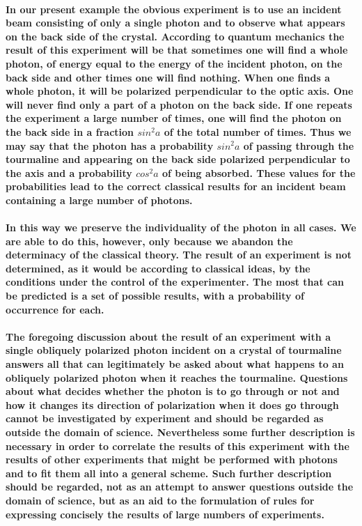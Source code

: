 \documentclass[10pt, kindle, oneside]{kindle}
\begin{document}
\paragraph{In our present example the obvious experiment is to use an incident beam consisting of only a single photon and to observe what appears on the back side of the crystal. According to quantum mechanics the result of this experiment will be that sometimes one will find a whole photon, of energy equal to the energy of the incident photon, on the back side and other times one will find nothing. When one finds a whole photon, it will be polarized perpendicular to the optic axis. One will never find only a part of a photon on the back side. If one repeats the experiment a large number of times, one will find the photon on the back side in a fraction $sin^{2}a$ of the total number of times. Thus we may say that the photon has a probability $sin^{2}a$ of passing through the tourmaline and appearing on the back side polarized perpendicular to the axis and a probability $cos^{2}a$ of being absorbed. These values for the probabilities lead to the correct classical results for an incident beam containing a large number of photons.}
\paragraph{In this way we preserve the individuality of the photon in all cases. We are able to do this, however, only because we abandon the determinacy of the classical theory. The result of an experiment is not determined, as it would be according to classical ideas, by the conditions under the control of the experimenter. The most that can be predicted is a set of possible results, with a probability of occurrence for each.}
\paragraph{The foregoing discussion about the result of an experiment with a single obliquely polarized photon incident on a crystal of tourmaline answers all that can legitimately be asked about what happens to an obliquely polarized photon when it reaches the tourmaline. Questions about what decides whether the photon is to go through or not and how it changes its direction of polarization when it does go through cannot be investigated by experiment and should be regarded as outside the domain of science. Nevertheless some further description is necessary in order to correlate the results of this experiment with the results of other experiments that might be performed with photons and to fit them all into a general scheme. Such further description should be regarded, not as an attempt to answer questions outside the domain of science, but as an aid to the formulation of rules for expressing concisely the results of large numbers of experiments.}
\end{document}
